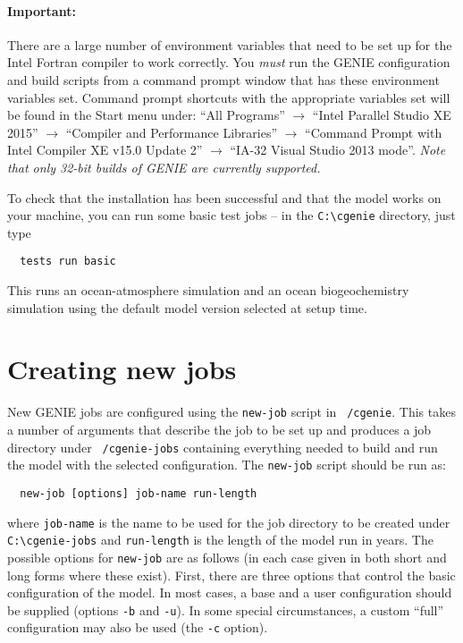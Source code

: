 \documentclass[a4paper,10pt,article]{memoir}
\begin{document}
\paragraph{Important:}

There are a large number of environment variables that need to be set
up for the Intel Fortran compiler to work correctly.  You \emph{must}
run the GENIE configuration and build scripts from a command prompt
window that has these environment variables set.  Command prompt
shortcuts with the appropriate variables set will be found in the
Start menu under: ``All Programs'' $\to$ ``Intel Parallel Studio XE
2015'' $\to$ ``Compiler and Performance Libraries'' $\to$ ``Command
Prompt with Intel Compiler XE v15.0 Update 2'' $\to$ ``IA-32 Visual
Studio 2013 mode''.  \emph{Note that only 32-bit builds of GENIE are
  currently supported.}

\vspace{\baselineskip}

To check that the installation has been successful and that the model
works on your machine, you can run some basic test jobs -- in the
\texttt{C:\textbackslash{}cgenie} directory, just type
\begin{verbatim}
  tests run basic
\end{verbatim}
This runs an ocean-atmosphere simulation and an ocean biogeochemistry
simulation using the default model version selected at setup time.

\section{Creating new jobs}

New GENIE jobs are configured using the \texttt{new-job} script in
\texttt{~/cgenie}.  This takes a number of arguments that describe the
job to be set up and produces a job directory under
\texttt{~/cgenie-jobs} containing everything needed to build and run
the model with the selected configuration.  The \texttt{new-job}
script should be run as:
\begin{verbatim}
  new-job [options] job-name run-length
\end{verbatim}
where \texttt{job-name} is the name to be used for the job directory
to be created under \texttt{C:\textbackslash{}cgenie-jobs} and
\texttt{run-length} is the length of the model run in years.  The
possible options for \texttt{new-job} are as follows (in each case
given in both short and long forms where these exist).  First, there
are three options that control the basic configuration of the model.
In most cases, a base and a user configuration should be supplied
(options \texttt{-b} and \texttt{-u}).  In some special circumstances,
a custom ``full'' configuration may also be used (the \texttt{-c}
option).
\end{document}
